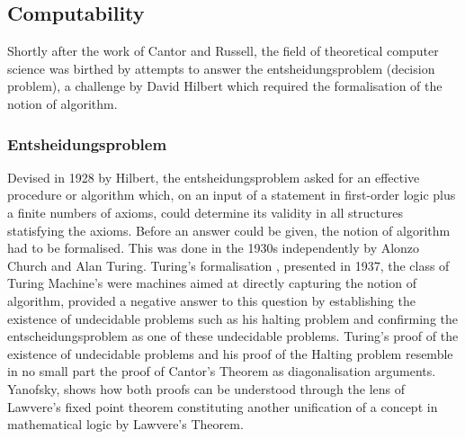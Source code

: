 
\subsection{Computability}
Shortly after the work of Cantor and Russell, the field of theoretical computer
science was birthed by attempts to answer the entsheidungsproblem (decision
problem), a challenge by David Hilbert \cite{hilbert1928theoretische} which required the formalisation of the
notion of algorithm.

\subsubsection{Entsheidungsproblem}

Devised in 1928 by Hilbert, the entsheidungsproblem asked for an effective
procedure or algorithm which, on an input of a statement in first-order logic
plus a finite numbers of axioms, could determine its validity in all structures
statisfying the axioms. Before an answer could be given, the notion of algorithm
had to be formalised. This was done in the 1930s independently by Alonzo Church
and Alan Turing. Turing's formalisation \cite{turing1937computable}, presented
in 1937, the class of Turing Machine's were machines aimed at directly capturing
the notion of algorithm, provided a negative answer to this question by
establishing the existence of undecidable problems such as his halting problem
and confirming the entscheidungsproblem as one of these undecidable problems.
Turing's proof of the existence of undecidable problems and his proof of the
Halting problem resemble in no small part the proof of Cantor's Theorem as
diagonalisation arguments. Yanofsky, shows how both proofs can be understood
through the lens of Lawvere's fixed point theorem constituting another
unification of a concept in mathematical logic by Lawvere's Theorem.
